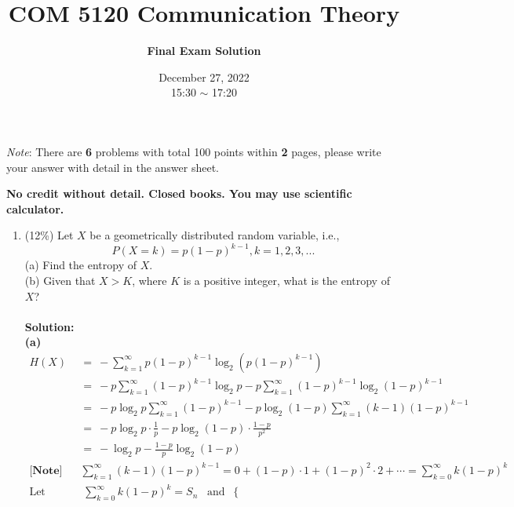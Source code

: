 \documentclass[a4paper,12pt]{article}
\title{\textbf{COM 5120 Communication Theory}}
\author{\textbf{Final Exam Solution}}
\date{December 27, 2022\\
15:30 $\sim$ 17:20
}
\begin{document}
    \maketitle
    \textit{Note}: There are \textbf{6} problems with total 100 points within \textbf{2} pages, please write your answer with detail in the answer sheet.

    {\bf No credit without detail. Closed books. You may use scientific calculator.}

    \begin{enumerate}
        \item (12\%)
            Let $X$ be a geometrically distributed random variable, i.e., $$P(X = k) = p(1-p)^{k - 1}, k = 1, 2, 3, ...$$
            (a) Find the entropy of $X$. \\ 
            (b) Given that $X > K$, where $K$ is a positive integer, what is the entropy of $X$? \\ \\ 
            \textbf{Solution:} \\
            \textbf{(a)} 
            \begin{align*}
                H(X) &= \ - \sum_{k = 1}^{\infty} p \left(1 - p\right)^{k - 1} \log_2 \left(p\left(1 - p\right)^{k - 1}\right) \\
                     &= \ -p \sum_{k = 1}^{\infty} \left(1 - p\right)^{k - 1} \log_2 p - p \sum_{k = 1}^{\infty} \left(1 - p\right)^{k - 1} \log_2 \left(1 - p\right)^{k - 1} \\ 
                     &= \ -p \log_2 p \sum_{k = 1}^{\infty} \left(1 - p\right)^{k - 1} - p \log_2 (1 - p) \sum_{k = 1}^{\infty} (k - 1)\left(1 - p\right)^{k - 1} \\
                     &= \ -p \log_2 p \cdot \frac{1}{p} - p \log_2 (1 - p) \cdot \frac{1 - p}{p^2} \\ 
                     &= \ - \log_2 p - \frac{1 - p}{p} \log_2 (1 - p) \\ 
                \textbf{[Note]} \;\;\; & \sum_{k = 1}^{\infty} (k - 1)\left(1 - p\right)^{k - 1} = 0 + (1 - p) \cdot 1 + (1 - p)^2 \cdot 2 + \cdots = \sum_{k = 0}^{\infty} k \left(1 - p\right)^{k} \\ 
                                 \text{Let} & \; \sum_{k = 0}^{\infty} k \left(1 - p\right)^{k} = S_n \;\;\; \text{and} \;\;
                                 \left\{ 
                                \begin{aligned}

\end{aligned}
\end{align*}
\end{enumerate}
\end{document}
